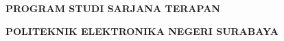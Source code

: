 \begin{center}

  \vspace{1cm}

  {\FontJudulDalamIsi\bfseries PROGRAM STUDI SARJANA TERAPAN\par}
  {\FontJudulDalamIsi\bfseries \MakeUppercase{\NamaProdi}\par}
  {\FontJudulDalamIsi\bfseries \MakeUppercase{\NamaDepartemen}\par}

  \vspace{0.5cm}

  {\FontJudulDalamIsi\bfseries POLITEKNIK ELEKTRONIKA NEGERI SURABAYA\par}
  {\FontJudulDalamIsi\bfseries \TahunLulus\par}

\end{center}